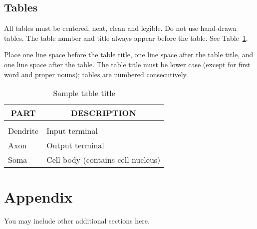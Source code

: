 \documentclass{article} %
\begin{document}
\subsection{Tables}

All tables must be centered, neat, clean and legible. Do not use hand-drawn
tables. The table number and title always appear before the table. See
Table~\ref{sample-table}.

Place one line space before the table title, one line space after the table
title, and one line space after the table. The table title must be lower case
(except for first word and proper nouns); tables are numbered consecutively.

\begin{table}[t]
\caption{Sample table title}
\label{sample-table}
\begin{center}
\begin{tabular}{ll}
\multicolumn{1}{c}{\bf PART}  &\multicolumn{1}{c}{\bf DESCRIPTION}
\\ \hline \\
Dendrite         &Input terminal \\
Axon             &Output terminal \\
Soma             &Cell body (contains cell nucleus) \\
\end{tabular}
\end{center}
\end{table}

\section{Appendix}
You may include other additional sections here.
\end{document}
